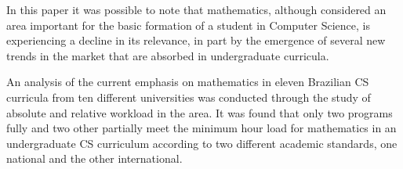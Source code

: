 \documentclass[conference]{IEEEtran}
\begin{document}
	In this paper it was possible to note that mathematics, although considered an area important for the basic formation of a student in Computer Science, is experiencing a decline in its relevance, in part by the emergence of several new trends in the market that are absorbed in undergraduate curricula. 
	
	An analysis of the current emphasis on mathematics in eleven Brazilian CS curricula from ten different universities was conducted through the study of absolute and relative workload in the area. It was found that only two programs fully and two other partially meet the minimum hour load for mathematics in an undergraduate CS curriculum according to two different academic standards, one national and the other international.
	
%
%



%
%
\end{document}
